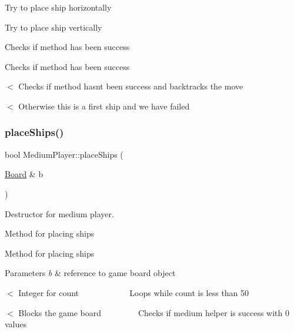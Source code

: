 Try to place ship horizontally

Try to place ship vertically

Checks if method has been success

Checks if method has been success

$<$ Checks if method hasn\textquotesingle{}t been success and backtracks the move

$<$ Otherwise this is a first ship and we have failed \mbox{\label{class_medium_player_ac4d4748e2c27a2a51033bbce9f12de26}} 
\subsubsection{\texorpdfstring{place\+Ships()}{placeShips()}}
{\footnotesize\ttfamily bool Medium\+Player\+::place\+Ships (\begin{DoxyParamCaption}\item[{\mbox{\hyperlink{class_board}{Board}} \&}]{b }\end{DoxyParamCaption})\hspace{0.3cm}{\ttfamily [virtual]}}



Destructor for medium player. 

Method for placing ships

Method for placing ships 
\begin{DoxyParams}{Parameters}
{\em b} & reference to game board object \\
\hline
\end{DoxyParams}
$<$ Integer for count ~\newline
~\newline
~\newline
~\newline
~\newline
~\newline
~\newline
 Loops while count is less than 50

$<$ Blocks the game board ~\newline
~\newline
~\newline
~\newline
~\newline
 Checks if medium helper is success with 0 values

